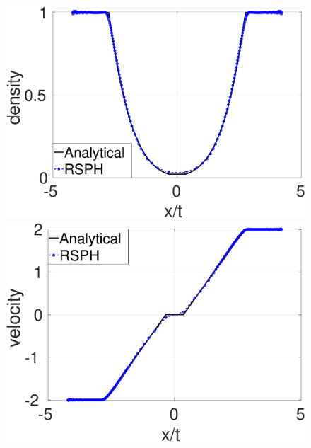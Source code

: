 \begin{figure}
	\centering
    \begin{minipage}{.415\textwidth}
        \centering
        \includegraphics[width=0.99 \textwidth]{./Chapter-4/Figures/Sjogreen/Sjogreen-RCM-rho-Adpt1}
    \end{minipage}%
    \begin{minipage}{.415 \textwidth}
        \centering
        \includegraphics[width=0.99 \textwidth]{./Chapter-4/Figures/Sjogreen/Sjogreen-RCM-v-Adpt1}
    \end{minipage}%
    \\
    \begin{minipage}{.415\textwidth}
        \centering

\end{minipage}
\end{figure}
